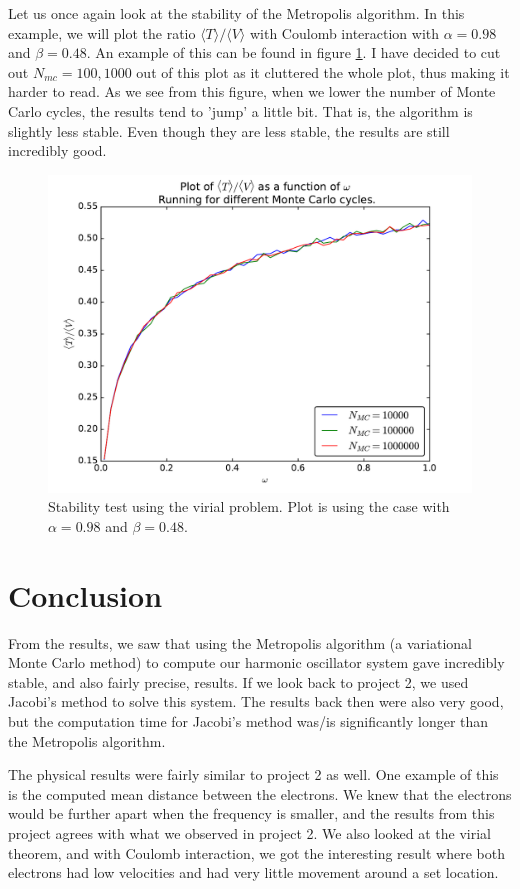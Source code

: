 \documentclass[12pt]{article}
\begin{document}
Let us once again look at the stability of the Metropolis algorithm. In this example, we will plot the ratio $\langle T \rangle / \langle V \rangle$ with Coulomb interaction with $\alpha = 0.98$ and $\beta = 0.48$. An example of this can be found in figure \ref{fig:Stability_virial}. I have decided to cut out $N_{mc} = 100, 1000$ out of this plot as it cluttered the whole plot, thus making it harder to read. As we see from this figure, when we lower the number of Monte Carlo cycles, the results tend to 'jump' a little bit. That is, the algorithm is slightly less stable. Even though they are less stable, the results are still incredibly good.
\begin{figure}[h]
\centering
\includegraphics[width=\linewidth]{Plots/Virial_stability_test.pdf}
\caption{Stability test using the virial problem. Plot is using the case with $\alpha = 0.98$ and $\beta = 0.48$.}
\label{fig:Stability_virial}
\end{figure}
\FloatBarrier
\section{Conclusion}\label{section:conclusion}
From the results, we saw that using the Metropolis algorithm (a variational Monte Carlo method) to compute our harmonic oscillator system gave incredibly stable, and also fairly precise, results. If we look back to project 2, we used Jacobi's method to solve this system. The results back then were also very good, but the computation time for Jacobi's method was/is significantly longer than the Metropolis algorithm.

The physical results were fairly similar to project 2 as well. One example of this is the computed mean distance between the electrons. We knew that the electrons would be further apart when the frequency is smaller, and the results from this project agrees with what we observed in project 2.  We also looked at the virial theorem, and with Coulomb interaction, we got the interesting result where both electrons had low velocities and had very little movement around a set location.
\end{document}
